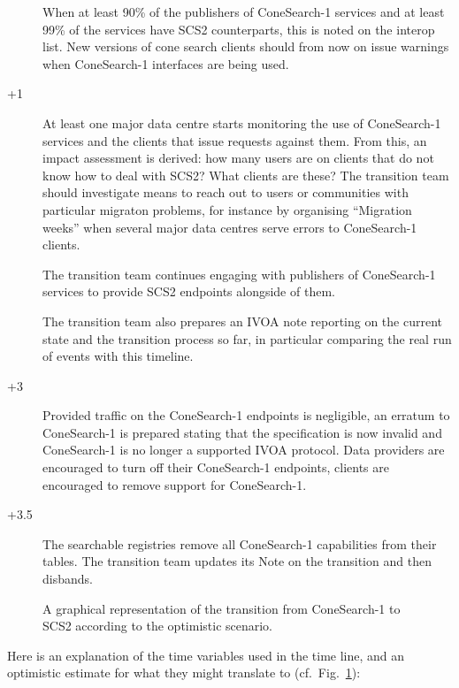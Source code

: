 \documentclass[11pt,a4paper]{ivoa}
\begin{document}
\begin{description}
\item[] When at least 90\% of the publishers of ConeSearch-1
services and at least 99\% of the services have SCS2 counterparts, this
is noted on the interop list.  New versions of cone search clients
should from now on issue warnings when ConeSearch-1 interfaces are being
used.

\item[+1] At least one major data centre starts monitoring the
use of ConeSearch-1 services and the clients that issue requests against
them.  From this, an impact assessment is derived: how many users are on
clients that do not know how to deal with SCS2?  What clients are these?
The transition team should investigate means to reach out to users or
communities with particular migraton problems, for instance by
organising ``Migration weeks'' when several major data centres serve
errors to ConeSearch-1 clients.

The transition team continues engaging with publishers of ConeSearch-1
services to provide SCS2 endpoints alongside of them.

The transition team also prepares an IVOA note reporting on the current
state and the transition process so far, in particular comparing the
real run of events with this timeline.

\item[+3] Provided traffic on the ConeSearch-1 endpoints is
negligible, an erratum to ConeSearch-1 is prepared stating that the
specification is now invalid and ConeSearch-1 is no longer a supported
IVOA protocol.  Data providers are encouraged to turn off their
ConeSearch-1 endpoints, clients are encouraged to remove support for
ConeSearch-1.

\item[+3.5] The searchable registries remove all ConeSearch-1
capabilities from their tables.  The transition team updates its Note on
the transition and then disbands.

\end{description}


\begin{figure}
\caption{A graphical representation of the transition from ConeSearch-1
to SCS2 according to the optimistic scenario.}
\label{fig:timeline}
\end{figure}

Here is an explanation of the time variables used in the time line, and
an optimistic estimate for what they might translate to
(cf.~Fig.~\ref{fig:timeline}):
\end{document}
